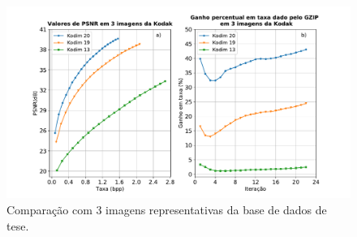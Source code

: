 \begin{figure}
	\centering
	\includegraphics[width=1.0\textwidth]{figuras/comp_gain_psnr.pdf}
	\caption[Comparação em 3 imagens representativas da Kodak.]{Comparação com  3 imagens representativas da base de dados de tese.}   	
	\label{fig:comp_gain_psnr}
\end{figure}




